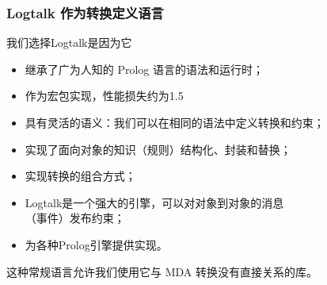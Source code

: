 \documentclass[10pt]{beamer}
\begin{document}
\begin{frame}
  \frametitle{Logtalk 作为转换定义语言}
  我们选择Logtalk是因为它
  \begin{itemize}
  \item 继承了广为人知的 Prolog 语言的语法和运行时；
  \item 作为宏包实现，性能损失约为1.5%
  \item 具有灵活的语义：我们可以在相同的语法中定义转换和约束；
  \item 实现了面向对象的知识（规则）结构化、封装和替换；
  \item 实现转换的组合方式；
  \item Logtalk是一个强大的引擎，可以对对象到对象的消息 \\
    （事件）发布约束；
  \item 为各种Prolog引擎提供实现。
  \end{itemize}
这种常规语言允许我们使用它与 MDA 转换没有直接关系的库。
\end{frame}

\end{document}

